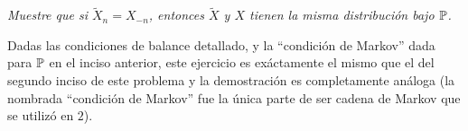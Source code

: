 \emph{
    Muestre que si $\tilde X_n = X_{-n}$, entonces $\tilde X$ y $X$ tienen la misma distribución bajo $\P$.
}

\afterstatement\pn

Dadas las condiciones de balance detallado, y la ``condición de Markov'' dada para $\P$ en el inciso anterior, 
este ejercicio es exáctamente el mismo que el del segundo inciso de este problema y la demostración es 
completamente análoga (la nombrada ``condición de Markov'' fue la única parte de ser cadena de Markov que se utilizó en $2$).